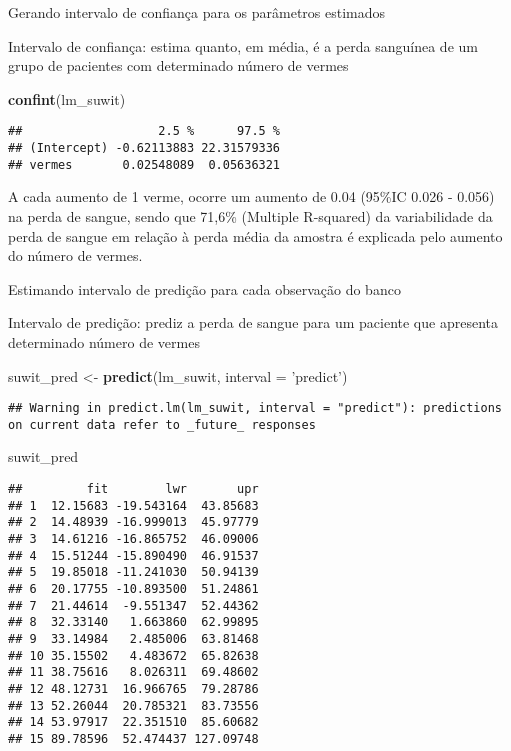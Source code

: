\documentclass[]{article}
\newenvironment{Shaded}{\begin{snugshade}}{\end{snugshade}}
\newcommand{\DataTypeTok}[1]{\textcolor[rgb]{0.13,0.29,0.53}{#1}}
\newcommand{\KeywordTok}[1]{\textcolor[rgb]{0.13,0.29,0.53}{\textbf{#1}}}
\newcommand{\NormalTok}[1]{#1}
\newcommand{\StringTok}[1]{\textcolor[rgb]{0.31,0.60,0.02}{#1}}
\begin{document}
Gerando intervalo de confiança para os parâmetros estimados

Intervalo de confiança: estima quanto, em média, é a perda sanguínea de
um grupo de pacientes com determinado número de vermes

\begin{Shaded}
\begin{Highlighting}[]
\KeywordTok{confint}\NormalTok{(lm_suwit)}
\end{Highlighting}
\end{Shaded}

\begin{verbatim}
##                   2.5 %      97.5 %
## (Intercept) -0.62113883 22.31579336
## vermes       0.02548089  0.05636321
\end{verbatim}

A cada aumento de 1 verme, ocorre um aumento de 0.04 (95\%IC 0.026 -
0.056) na perda de sangue, sendo que 71,6\% (Multiple R-squared) da
variabilidade da perda de sangue em relação à perda média da amostra é
explicada pelo aumento do número de vermes.

Estimando intervalo de predição para cada observação do banco

Intervalo de predição: prediz a perda de sangue para um paciente que
apresenta determinado número de vermes

\begin{Shaded}
\begin{Highlighting}[]
\NormalTok{suwit_pred <-}\StringTok{ }\KeywordTok{predict}\NormalTok{(lm_suwit, }\DataTypeTok{interval =} \StringTok{'predict'}\NormalTok{)}
\end{Highlighting}
\end{Shaded}

\begin{verbatim}
## Warning in predict.lm(lm_suwit, interval = "predict"): predictions on current data refer to _future_ responses
\end{verbatim}

\begin{Shaded}
\begin{Highlighting}[]
\NormalTok{suwit_pred}
\end{Highlighting}
\end{Shaded}

\begin{verbatim}
##         fit        lwr       upr
## 1  12.15683 -19.543164  43.85683
## 2  14.48939 -16.999013  45.97779
## 3  14.61216 -16.865752  46.09006
## 4  15.51244 -15.890490  46.91537
## 5  19.85018 -11.241030  50.94139
## 6  20.17755 -10.893500  51.24861
## 7  21.44614  -9.551347  52.44362
## 8  32.33140   1.663860  62.99895
## 9  33.14984   2.485006  63.81468
## 10 35.15502   4.483672  65.82638
## 11 38.75616   8.026311  69.48602
## 12 48.12731  16.966765  79.28786
## 13 52.26044  20.785321  83.73556
## 14 53.97917  22.351510  85.60682
## 15 89.78596  52.474437 127.09748
\end{verbatim}
\end{document}
